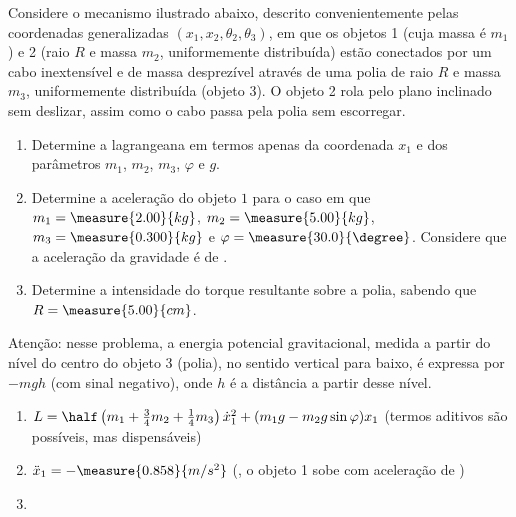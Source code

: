 \begin{question}
	Considere o mecanismo ilustrado abaixo, descrito convenientemente pelas coordenadas generalizadas $(x_1, x_2, \theta_2, \theta_3)$, em que os objetos 1 (cuja massa é $m_1$) e 2 (raio $R$ e massa $m_2$, uniformemente distribuída) estão conectados por um cabo inextensível e de massa desprezível através de uma polia de raio $R$ e massa $m_3$, uniformemente distribuída (objeto 3).
	O objeto 2 rola pelo plano inclinado sem deslizar, assim como o cabo passa pela polia sem escorregar.

	\begin{enumerate}
		\item Determine a lagrangeana em termos apenas da coordenada $x_1$ e dos parâmetros $m_1$, $m_2$, $m_3$, $\varphi$ e $g$.
		\item Determine a aceleração do objeto $1$ para o caso em que $m_1 = \measure{2.00}{kg}$, $m_2 = \measure{5.00}{kg}$, $m_3 = \measure{0.300}{kg}$ e $\varphi = \measure{30.0}{\degree}$. %
		Considere que a aceleração da gravidade é de .		
		\item Determine a intensidade do torque resultante sobre a polia, sabendo que $R = \measure{5.00}{cm}$. %
	\end{enumerate}


	\begin{compactdesc}
		\item[Atenção:] nesse problema, a energia potencial gravitacional, medida a partir do nível do centro do objeto 3 (polia), no sentido vertical para baixo, é expressa por $-mgh$ (com sinal negativo), onde $h$ é a distância a partir desse nível.
	\end{compactdesc}

	\begin{answer}
		\begin{enumerate}
			\item $L = \half\left(m_1 + \frac{3}{4}m_2 + \frac{1}{4}m_3\right)\dot x_1^2 + (m_1 g - m_2 g \sin\varphi)x_1$ (termos aditivos são possíveis, mas dispensáveis)
			\item $\ddot x_1 = -\measure{0.858}{m/s^2}$ (\ie, o objeto 1 sobe com aceleração de ) %
			\item {} %
		\end{enumerate}
	\end{answer}


\end{question}

